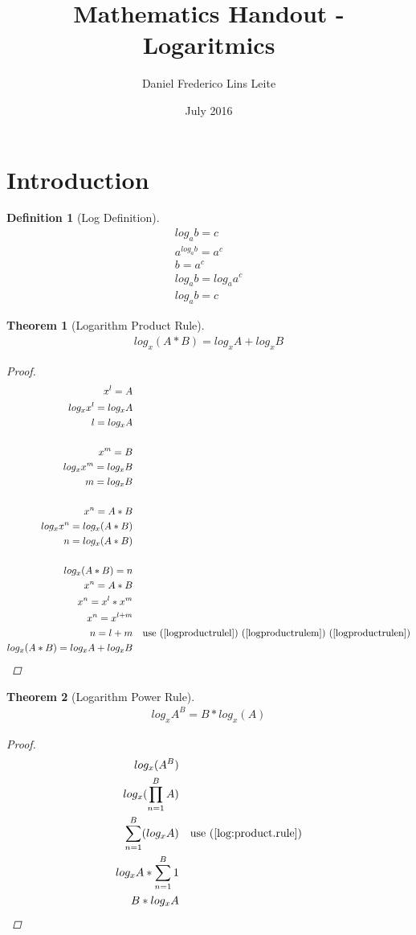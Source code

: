\documentclass{article}
\title{Mathematics Handout - Logaritmics}
\author{Daniel Frederico Lins Leite}
\date{July 2016}
\newtheorem{theorem}{Theorem}[section]
\theoremstyle{definition}
\newtheorem{definition}{Definition}[theorem]
\begin{document}
\section{Introduction}
\begin{definition}[Log Definition]\label{definitions:log}
	\begin{align*}
		log_a b=c \\
		a^{log_a b}=a^c \\
		b=a^c \\
		log_a b=log_a a^c \\
		log_a b= c		
	\end{align*}
\end{definition}
\begin{theorem}[Logarithm Product Rule]\label{log:product.rule}
	\begin{align*}
	log_x{(A*B)}=log_x A + log_x B
	\end{align*}
	\begin{proof}
		\begin{align}			
			x^l = A \\
			log_x {x^l} = log_x A \\
			l = log_x A \label{logproductrulel} \\ 			
			\nonumber\\
			x^m = B \\
			log_x {x^m} = log_x B \\
			\label{logproductrulem} m = log_x B \\
			\nonumber\\
			x^n = A*B \\
			log_x{x^n} = log_x{(A*B)} \\
			\label{logproductrulen}n = log_x{(A*B)} \\
			\nonumber\\
			log_x{(A*B)} = n \\
			x^n = A*B \\
			x^n	= x^l*x^m \\
			x^n	= x^{l+m} \\
			n = l + m && \text{use (\ref{logproductrulel}) (\ref{logproductrulem}) 	(\ref{logproductrulen})}\\
			log_x{(A*B)} = log_x A + log_x B		
		\end{align}
	\end{proof}	
\end{theorem}
\begin{theorem}[Logarithm Power Rule]\label{log:power.rule}
	\begin{align*}
	log_x{A^B}=B*log_x(A)
	\end{align*}
	\begin{proof}
		\begin{align}
		log_x{(A^B)} \\
		log_x{(\prod_{n=1}^{B}A)}\\
		\sum_{n=1}^{B}(log_x{A}) && \text{use (\ref{log:product.rule})}\\
		log_x{A}*\sum_{n=1}^{B}1\\
		B*log_x{A}
		\end{align}
	\end{proof}
\end{theorem}
\end{document}
